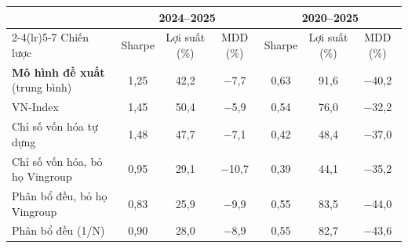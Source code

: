 \begin{tabular}{@{}lcccccc@{}}
\toprule
 & \multicolumn{3}{c}{2024--2025} & \multicolumn{3}{c}{2020--2025} \\
\cmidrule(lr){2-4}\cmidrule(lr){5-7}
Chiến lược & Sharpe & Lợi suất (\%) & MDD (\%) & Sharpe & Lợi suất (\%) & MDD (\%) \\
\midrule
\textbf{Mô hình đề xuất} (trung bình) & 1{,}25 & 42{,}2 & $-$7{,}7 & 0{,}63 & 91{,}6 & $-$40{,}2 \\
VN-Index & 1{,}45 & 50{,}4 & $-$5{,}9 & 0{,}54 & 76{,}0 & $-$32{,}2 \\
Chỉ số vốn hóa tự dựng & 1{,}48 & 47{,}7 & $-$7{,}1 & 0{,}42 & 48{,}4 & $-$37{,}0 \\
Chỉ số vốn hóa, bỏ họ Vingroup & 0{,}95 & 29{,}1 & $-$10{,}7 & 0{,}39 & 44{,}1 & $-$35{,}2 \\
Phân bổ đều, bỏ họ Vingroup & 0{,}83 & 25{,}9 & $-$9{,}9 & 0{,}55 & 83{,}5 & $-$44{,}0 \\
Phân bổ đều (1/N) & 0{,}90 & 28{,}0 & $-$8{,}9 & 0{,}55 & 82{,}7 & $-$43{,}6 \\
\bottomrule
\end{tabular}
